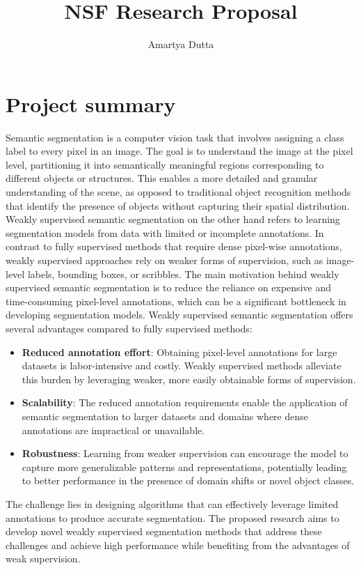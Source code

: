 \documentclass[11pt]{article}
\title{\textbf{NSF Research Proposal}}
\author{Amartya Dutta}
\date{}
\begin{document}
\clearpage\maketitle
\thispagestyle{empty}
\section{Project summary}
Semantic segmentation is a computer vision task that involves assigning a class label to every pixel in an image. The goal is to understand the image at the pixel level, partitioning it into semantically meaningful regions corresponding to different objects or structures. This enables a more detailed and granular understanding of the scene, as opposed to traditional object recognition methods that identify the presence of objects without capturing their spatial distribution. Weakly supervised semantic segmentation on the other hand refers to learning segmentation models from data with limited or incomplete annotations. In contrast to fully supervised methods that require dense pixel-wise annotations, weakly supervised approaches rely on weaker forms of supervision, such as image-level labels, bounding boxes, or scribbles. The main motivation behind weakly supervised semantic segmentation is to reduce the reliance on expensive and time-consuming pixel-level annotations, which can be a significant bottleneck in developing segmentation models. \newline
Weakly supervised semantic segmentation offers several advantages compared to fully supervised methods:
\begin{itemize}
\item \textbf{Reduced annotation effort}: Obtaining pixel-level annotations for large datasets is labor-intensive and costly. Weakly supervised methods alleviate this burden by leveraging weaker, more easily obtainable forms of supervision.
\item \textbf{Scalability}: The reduced annotation requirements enable the application of semantic segmentation to larger datasets and domains where dense annotations are impractical or unavailable.
\item \textbf{Robustness}: Learning from weaker supervision can encourage the model to capture more generalizable patterns and representations, potentially leading to better performance in the presence of domain shifts or novel object classes.
\end{itemize}
The challenge lies in designing algorithms that can effectively leverage limited annotations to produce accurate segmentation. The proposed research aims to develop novel weakly supervised segmentation methods that address these challenges and achieve high performance while benefiting from the advantages of weak supervision.
\end{document}

